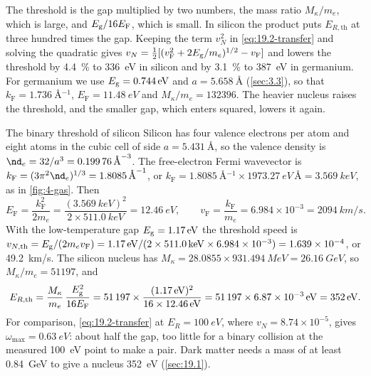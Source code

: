 The threshold is the gap multiplied by two numbers, the mass ratio $M_\kappa/m_e$, which is large, and $E_{\mathrm{g}}/16E_{\mathrm{F}}$, which is small. In silicon the product puts $E_{R,\mathrm{th}}$ at three hundred times the gap. Keeping the term $v_N^2$ in \cref{eq:19.2-transfer} and solving the quadratic gives $v_N = \tfrac12[(v_{\mathrm{F}}^2 + 2E_{\mathrm{g}}/m_e)^{1/2} - v_{\mathrm{F}}]$ and lowers the threshold by \SI{4.4}{\percent} to \SI{336}{eV} in silicon and by \SI{3.1}{\percent} to \SI{387}{eV} in germanium. For germanium we use $E_{\mathrm{g}} = \SI{0.744}{eV}$ and $a = \SI{5.658}{\angstrom}$ (\cref{sec:3.3}), so that $k_{\mathrm{F}} = \SI{1.736}{\angstrom^{-1}}$, $E_{\mathrm{F}} = \SI{11.48}{eV}$ and $M_\kappa/m_e = \num{132396}$. The heavier nucleus raises the threshold, and the smaller gap, which enters squared, lowers it again.

\begin{workedexample}{The binary threshold of silicon}\label{we:19-threshold}
Silicon has four valence electrons per atom and eight atoms in the cubic cell of side $a = \SI{5.431}{\angstrom}$, so the valence density is $\nd_e = 32/a^3 = \SI{0.19976}{\angstrom^{-3}}$. The free-electron Fermi wavevector is $k_{\mathrm{F}} = (3\pi^2\nd_e)^{1/3} = \SI{1.8085}{\angstrom^{-1}}$, or $k_{\mathrm{F}} = \SI{1.8085}{\angstrom^{-1}}\times\SI{1973.27}{eV\,\angstrom} = \SI{3.569}{keV}$, as in \cref{fig:4-gas}. Then
\begin{equation*}
  E_{\mathrm{F}} = \frac{k_{\mathrm{F}}^2}{2m_e} = \frac{(\SI{3.569}{keV})^2}{2\times\SI{511.0}{keV}} = \SI{12.46}{eV} , \qquad
  v_{\mathrm{F}} = \frac{k_{\mathrm{F}}}{m_e} = 6.984\times10^{-3} = \SI{2094}{km/s} .
\end{equation*}
With the low-temperature gap $E_{\mathrm{g}} = \SI{1.17}{eV}$ the threshold speed is $v_{N,\mathrm{th}} = E_{\mathrm{g}}/(2m_ev_{\mathrm{F}}) = \SI{1.17}{eV}/(2\times\SI{511.0}{keV}\times6.984\times10^{-3}) = 1.639\times10^{-4}$, or \SI{49.2}{km/s}. The silicon nucleus has $M_\kappa = 28.0855\times\SI{931.494}{MeV} = \SI{26.16}{GeV}$, so $M_\kappa/m_e = \num{51197}$, and
\begin{equation*}
  E_{R,\mathrm{th}} = \frac{M_\kappa}{m_e}\,\frac{E_{\mathrm{g}}^2}{16E_{\mathrm{F}}} = \num{51197}\times\frac{(\SI{1.17}{eV})^2}{16\times\SI{12.46}{eV}} = \num{51197}\times\SI{6.87e-3}{eV} = \SI{352}{eV} .
\end{equation*}
For comparison, \cref{eq:19.2-transfer} at $E_R = \SI{100}{eV}$, where $v_N = 8.74\times10^{-5}$, gives $\omega_{\mathrm{max}} = \SI{0.63}{eV}$: about half the gap, too little for a binary collision at the measured \SI{100}{eV} point to make a pair. Dark matter needs a mass of at least \SI{0.84}{GeV} to give a nucleus \SI{352}{eV} (\cref{sec:19.1}).
\end{workedexample}

